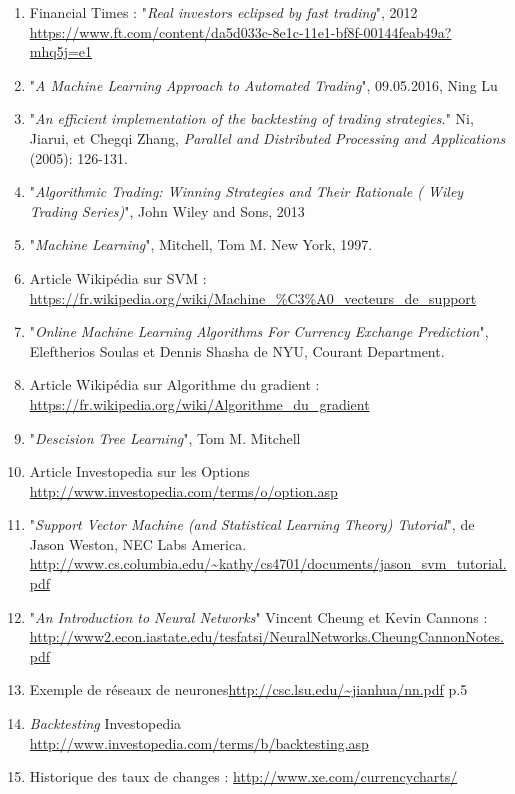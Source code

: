 \documentclass[a4paper, 11pt]{article}
\begin{document}
\begin{enumerate}
\item Financial Times : "\textit{Real investors eclipsed by fast trading}", 2012 \url{https://www.ft.com/content/da5d033c-8e1c-11e1-bf8f-00144feab49a?mhq5j=e1} \label{real investors}
\item "\textit{A Machine Learning Approach to Automated Trading}", 09.05.2016, Ning Lu
\item "\textit{An efficient implementation of the backtesting of trading strategies.}" Ni, Jiarui, et Chegqi Zhang, \textit{Parallel and Distributed Processing and Applications} (2005): 126-131.
\item "\textit{Algorithmic Trading: Winning Strategies and Their Rationale ( Wiley Trading Series)}", John Wiley and Sons, 2013
\item "\textit{Machine Learning}", Mitchell, Tom M. New York, 1997.
\item Article Wikipédia sur SVM : \url{https://fr.wikipedia.org/wiki/Machine_\%C3\%A0_vecteurs_de_support} \label{wikipedia svm}
\item "\textit{Online Machine Learning Algorithms For Currency Exchange Prediction}", Eleftherios Soulas et Dennis Shasha de NYU, Courant Department. \label{descente du gradient stochastique}
\item  Article Wikipédia sur Algorithme du gradient : \url{https://fr.wikipedia.org/wiki/Algorithme_du_gradient} \label{wikipedia descente du gradient}
\item "\textit{Descision Tree Learning}", Tom M. Mitchell
\item Article Investopedia sur les Options \url{http://www.investopedia.com/terms/o/option.asp}
\item "\textit{Support Vector Machine (and Statistical Learning Theory) Tutorial}", de Jason Weston, NEC Labs America. \url{http://www.cs.columbia.edu/~kathy/cs4701/documents/jason_svm_tutorial.pdf}
\item  "\textit{An Introduction to Neural Networks}" Vincent Cheung et Kevin Cannons : \url{http://www2.econ.iastate.edu/tesfatsi/NeuralNetworks.CheungCannonNotes.pdf}
\item Exemple de réseaux de neurones\url{http://csc.lsu.edu/~jianhua/nn.pdf} p.5
\item \textit{Backtesting} Investopedia \url{http://www.investopedia.com/terms/b/backtesting.asp} \label{backtesting investopedia}
\item Historique des taux de changes : \url{http://www.xe.com/currencycharts/} \label{historique taux de change}
\end{enumerate}
\end{document}
